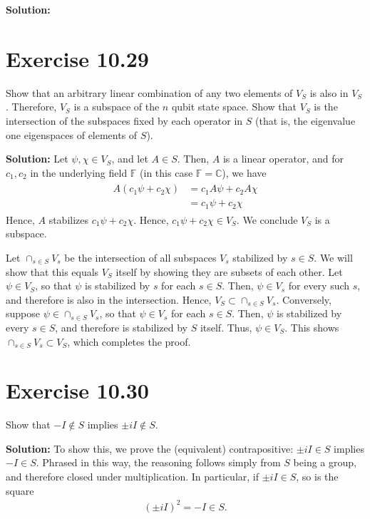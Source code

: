 \documentclass{book}
\begin{document}
    \textbf{Solution:}
    
\section*{Exercise 10.29}
    Show that an arbitrary linear combination of any two elements of $V_S$ is also in $V_S$ . Therefore, $V_S$ is a subspace of the $n$ qubit state space. Show that $V_S$ is the intersection of the subspaces fixed by each operator in $S$ (that is, the eigenvalue one eigenspaces of elements of $S$).
    
    \textbf{Solution:} Let $\psi, \chi \in V_S$, and let $A \in S$. Then, $A$ is a linear operator, and for $c_1, c_2$ in the underlying field $\mathbb{F}$ (in this case $\mathbb{F}=\mathbb{C}$), we have
    \begin{align}
    \begin{aligned}
        A\left(c_1\psi + c_2\chi\right) &= c_1 A\psi + c_2 A\chi \\
        &=c_1\psi + c_2 \chi
    \end{aligned}
    \end{align}
    Hence, $A$ stabilizes $c_1\psi + c_2\chi$. Hence, $c_1\psi + c_2 \chi\in V_S$. We conclude $V_S$ is a subspace. 
    
    Let $\cap_{s\in S} V_s$ be the intersection of all subspaces $V_s$ stabilized by $s\in S$. We will show that this equals $V_S$ itself by showing they are subsets of each other. Let $\psi \in V_S$, so that $\psi$ is stabilized by $s$ for each $s\in S$. Then, $\psi\in V_s$ for every such $s$, and therefore is also in the intersection. Hence, $V_S \subset \cap_{s\in S} V_s$. Conversely, suppose $\psi \in \cap_{s\in S} V_s$, so that $\psi\in V_s$ for each $s\in S$. Then, $\psi$ is stabilized by every $s \in S$, and therefore is stabilized by $S$ itself. Thus, $\psi \in V_S$. This shows $\cap_{s\in S} V_s \subset V_S$, which completes the proof.
    
\section*{Exercise 10.30}
    Show that $-I \notin S$ implies $\pm i I \notin S$.
    
    \textbf{Solution:} To show this, we prove the (equivalent) contrapositive: $\pm i I \in S$ implies $-I \in S$. Phrased in this way, the reasoning follows simply from $S$ being a group, and therefore closed under multiplication. In particular, if $\pm i I \in S$, so is the square
    \begin{align}
        (\pm i I)^2 = -I \in S.
    \end{align}
\end{document}
